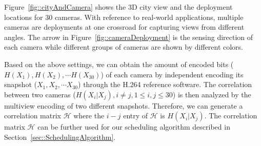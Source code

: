 %
Figure~\ref{fig::cityAndCamera} shows the $3$D city view and the deployment
locations for $30$ cameras.
With reference to real-world applications,
multiple cameras are deployments at one crossroad for capturing views from different angles.
The arrow in Figure~\ref{fig::cameraDeployment} is the sensing direction of
each camera while different groups of cameras are shown by different colors.
{\color{blue}

Based on the above settings, we can obtain the amount of encoded bits
(${H(X_1), H(X_2), \cdots H(X_{30})}$) of each camera by independent encoding
its snapshot (${X_1, X_2, \cdots X_{30}}$) through the H.264 reference
software.
The correlation between two cameras (${H(X_i|X_j),i\neq j,1\leq i,j\leq 30}$)
is then analyzed by the multiview encoding of two different snapshots.
Therefore, we can generate a correlation matrix $\mathcal{H}$ where the $i-j$
entry of $\mathcal{H}$ is $H(X_i|X_j)$.
The correlation matrix $\mathcal{H}$ can be further used for our scheduling
algorithm described in Section~\ref{sec::SchedulingAlgorithm}.
}

